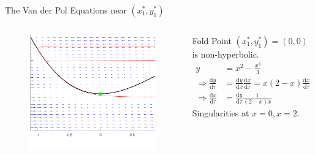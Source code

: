 \documentclass[11pt]{beamer}
\newcommand{\dif}{\mathrm{d}}
\begin{document}
\begin{frame}{The Van der Pol Equations near $(x_1^*,y_1^*)$}
\begin{columns}
\begin{figure}[h!]
    \centering
    \includegraphics[width=\textwidth]{PPlanecrop.png}
\end{figure}
Fold Point $(x_1^*,y_1^*)= (0,0) $  
\newline
is non-hyperbolic.
\begin{align*}
y&= x^2 - \frac{x^3}{3}\\
\Rightarrow \frac{\dif y}{\dif \tau}  &= \frac{\dif y}{\dif x} \frac{\dif x}{\dif\tau}  = x(2-x)\frac{\dif x}{\dif\tau}\\
\Rightarrow \frac{\dif x}{\dif\tau}&= \frac{\dif y}{\dif\tau}\frac{1}{(2-x)x}
\end{align*}
\newline
Singularities at $x=0,x=2$.
\end{columns}
\end{frame}


%
%
	
\end{document}
